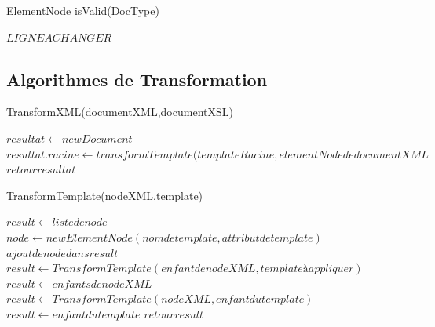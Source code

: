 \begin{algorithm}
\caption{ElementNode isValid(DocType)}
\begin{algorithmic}
\STATE $LIGNE A CHANGER$
\end{algorithmic}
\end{algorithm}

\subsection{Algorithmes de Transformation}

\begin{algorithm}
\caption{TransformXML(documentXML,documentXSL)}
\begin{algorithmic}
\STATE $resultat \leftarrow new Document$
\STATE $resultat.racine \leftarrow transformTemplate(templateRacine,elementNode de documentXML$
\ENDIF
\ENDFOR
\STATE $retour resultat$
\end{algorithmic}
\end{algorithm}

\begin{algorithm}
\caption{TransformTemplate(nodeXML,template)}
\begin{algorithmic}
\STATE $result \leftarrow liste de node$
\STATE $node \leftarrow new ElementNode(nom de template,attribut de template)$
\STATE $ajout de node dans result$
\ENDIF
{}
\STATE $result \leftarrow TransformTemplate(enfant de nodeXML,template à appliquer)$
\ENDIF
{}
\STATE $result \leftarrow enfants de nodeXML$
\ENDIF
\ELSE
\STATE $result \leftarrow TransformTemplate(nodeXML,enfant du template)$
\ENDIF
\ELSE
\STATE $result \leftarrow enfant du template$
\ENDIF
\ENDFOR
\STATE $retour result$
\end{algorithmic}
\end{algorithm}
